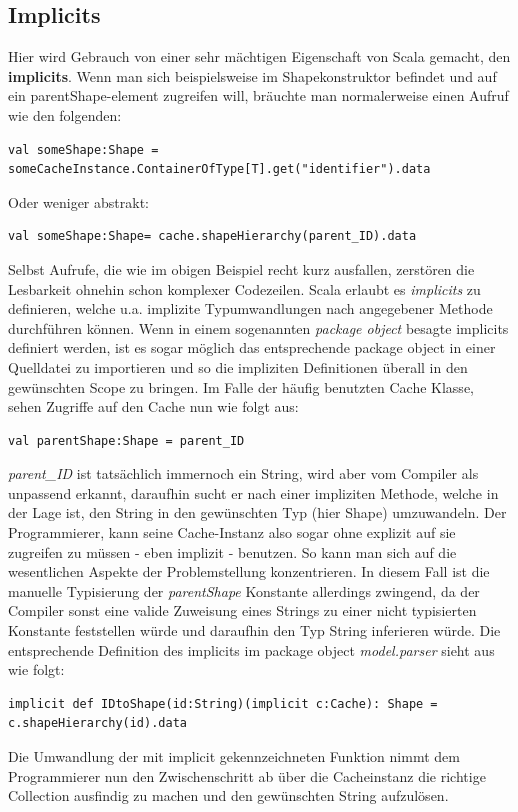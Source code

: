 \subsection{Implicits}
Hier wird Gebrauch von einer sehr mächtigen Eigenschaft von Scala gemacht, den \textbf{implicits}. Wenn man sich beispielsweise im Shapekonstruktor befindet und auf ein parentShape-element zugreifen will, bräuchte man normalerweise einen Aufruf wie den folgenden:
\begin{lstlisting}[style=scala]
val someShape:Shape =
someCacheInstance.ContainerOfType[T].get("identifier").data
\end{lstlisting}
Oder weniger abstrakt:
\begin{lstlisting}[style=scala]
val someShape:Shape= cache.shapeHierarchy(parent_ID).data
\end{lstlisting}
Selbst Aufrufe, die wie im obigen Beispiel recht kurz ausfallen, zerstören die Lesbarkeit ohnehin schon komplexer Codezeilen. Scala erlaubt es \textit{implicits} zu definieren, welche u.a. implizite Typumwandlungen nach angegebener Methode durchführen können. Wenn in einem sogenannten \textit{package object} besagte implicits definiert werden, ist es sogar möglich das entsprechende package object in einer Quelldatei zu importieren und so die impliziten Definitionen überall in den gewünschten Scope zu bringen. Im Falle der häufig benutzten Cache Klasse, sehen Zugriffe auf den Cache nun wie folgt aus:
\begin{lstlisting}[style=scala]
val parentShape:Shape = parent_ID
\end{lstlisting}
\textit{parent\_ID} ist tatsächlich immernoch ein String, wird aber vom Compiler als unpassend erkannt, daraufhin sucht er nach einer impliziten Methode, welche in der Lage ist, den String in den gewünschten Typ (hier Shape) umzuwandeln. Der Programmierer, kann seine Cache-Instanz also sogar ohne explizit auf sie zugreifen zu müssen - eben implizit - benutzen. So kann man sich auf die wesentlichen Aspekte der Problemstellung konzentrieren. In diesem Fall ist die manuelle Typisierung der \textit{parentShape} Konstante allerdings zwingend, da der Compiler sonst eine valide Zuweisung eines Strings zu einer nicht typisierten Konstante feststellen würde und daraufhin den Typ String inferieren würde. Die entsprechende Definition des implicits im package object \textit{model.parser} sieht aus wie folgt:
\begin{lstlisting}[style=scala]
implicit def IDtoShape(id:String)(implicit c:Cache): Shape =
c.shapeHierarchy(id).data
\end{lstlisting}Die Umwandlung der mit implicit gekennzeichneten Funktion nimmt dem Programmierer nun den Zwischenschritt ab über die Cacheinstanz die richtige Collection ausfindig zu machen und den gewünschten String aufzulösen.
